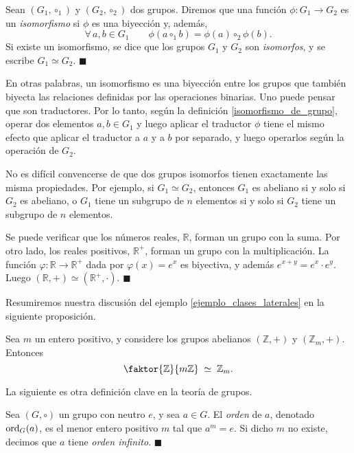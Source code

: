 \begin{definition}[Isomorfismo] \label{isomorfismo_de_grupo}
Sean $(G_1, \circ_1)$ y $(G_2, \circ_2)$ dos grupos. Diremos que una función $\phi\colon G_1 \rightarrow G_2$ es un \emph{isomorfismo} si $\phi$ es una biyección y, además,
$$\forall\, a, b \in G_1 \qquad \phi(a \circ_1 b) = \phi(a) \circ_2 \phi(b).$$
Si existe un isomorfismo, se dice que los grupos $G_1$ y $G_2$ son \emph{isomorfos}, y se escribe $G_1 \simeq G_2$. \hfill$\blacksquare$
\end{definition}

En otras palabras, un isomorfismo es una biyección entre los grupos que también biyecta las relaciones definidas por las operaciones binarias. Uno puede pensar que son traductores. Por lo tanto, según la definición \ref{isomorfismo_de_grupo}, operar dos elementos $a, b \in G_1$ y luego aplicar el traductor $\phi$ tiene el mismo efecto que aplicar el traductor a $a$ y a $b$ por separado, y luego operarlos según la operación de $G_2$.

No es difícil convencerse de que dos grupos isomorfos tienen exactamente las misma propiedades. Por ejemplo, si $G_1 \simeq G_2$, entonces $G_1$ es abeliano si y solo si $G_2$ es abeliano, o $G_1$ tiene un subgrupo de $n$ elementos si y solo si $G_2$ tiene un subgrupo de $n$ elementos.


\begin{example} \label{ejemplo_exponencial}
Se puede verificar que los números reales, $\mathbb{R}$, forman un grupo con la suma. Por otro lado, los reales positivos, $\mathbb{R}^{+}$, forman un grupo con la multiplicación. La función $\varphi\colon \mathbb{R} \rightarrow \mathbb{R}^{+}$ dada por $\varphi(x) = e^x$ es biyectiva, y además $e^{x+y} = e^x \cdot e^y$. Luego $(\mathbb{R}, +) \simeq (\mathbb{R}^{+}, \cdot)$. \hfill$\blacksquare$
\end{example}

Resumiremos nuestra discusión del ejemplo \ref{ejemplo_clases_laterales} en la siguiente proposición.

\begin{prop}
Sea $m$ un entero positivo, y considere los grupos abelianos $(\mathbb{Z}, +)$ y $(\mathbb{Z}_m, +)$. Entonces $$\faktor{\mathbb{Z}}{m \mathbb{Z}} \; \simeq \; \mathbb{Z}_m.$$
\end{prop}


La siguiente es otra definición clave en la teoría de grupos.

\begin{definition}\label{def_orden}
	Sea $(G,\circ)$ un grupo con neutro $e$, y sea $a \in G$. El \emph{orden} de $a$, denotado $\mathrm{ord}_{G}(a)$, es el menor entero positivo $m$ tal que $a^m = e$. Si dicho $m$ no existe, decimos que $a$ tiene \emph{orden infinito}. \hfill$\blacksquare$
\end{definition} 

